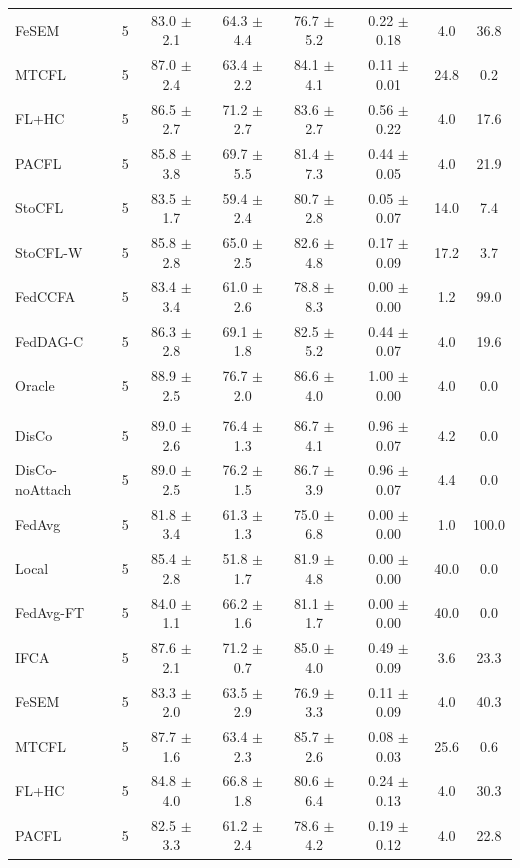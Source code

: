 {\begin{tabular}{l r c c c c c c}
FeSEM & 5 & 83.0 $\pm$ 2.1 & 64.3 $\pm$ 4.4 & 76.7 $\pm$ 5.2 & 0.22 $\pm$ 0.18 & 4.0 & 36.8 \\
MTCFL & 5 & 87.0 $\pm$ 2.4 & 63.4 $\pm$ 2.2 & 84.1 $\pm$ 4.1 & 0.11 $\pm$ 0.01 & 24.8 & 0.2 \\
FL+HC & 5 & 86.5 $\pm$ 2.7 & 71.2 $\pm$ 2.7 & 83.6 $\pm$ 2.7 & 0.56 $\pm$ 0.22 & 4.0 & 17.6 \\
PACFL & 5 & 85.8 $\pm$ 3.8 & 69.7 $\pm$ 5.5 & 81.4 $\pm$ 7.3 & 0.44 $\pm$ 0.05 & 4.0 & 21.9 \\
StoCFL & 5 & 83.5 $\pm$ 1.7 & 59.4 $\pm$ 2.4 & 80.7 $\pm$ 2.8 & 0.05 $\pm$ 0.07 & 14.0 & 7.4 \\
StoCFL-W & 5 & 85.8 $\pm$ 2.8 & 65.0 $\pm$ 2.5 & 82.6 $\pm$ 4.8 & 0.17 $\pm$ 0.09 & 17.2 & 3.7 \\
FedCCFA & 5 & 83.4 $\pm$ 3.4 & 61.0 $\pm$ 2.6 & 78.8 $\pm$ 8.3 & 0.00 $\pm$ 0.00 & 1.2 & 99.0 \\
FedDAG-C & 5 & 86.3 $\pm$ 2.8 & 69.1 $\pm$ 1.8 & 82.5 $\pm$ 5.2 & 0.44 $\pm$ 0.07 & 4.0 & 19.6 \\
Oracle & 5 & 88.9 $\pm$ 2.5 & 76.7 $\pm$ 2.0 & 86.6 $\pm$ 4.0 & 1.00 $\pm$ 0.00 & 4.0 & 0.0 \\
\addlinespace
\multicolumn{8}{l}{\textit{Mixed + QS}} \\
DisCo & 5 & 89.0 $\pm$ 2.6 & 76.4 $\pm$ 1.3 & 86.7 $\pm$ 4.1 & 0.96 $\pm$ 0.07 & 4.2 & 0.0 \\
DisCo-noAttach & 5 & 89.0 $\pm$ 2.5 & 76.2 $\pm$ 1.5 & 86.7 $\pm$ 3.9 & 0.96 $\pm$ 0.07 & 4.4 & 0.0 \\
FedAvg & 5 & 81.8 $\pm$ 3.4 & 61.3 $\pm$ 1.3 & 75.0 $\pm$ 6.8 & 0.00 $\pm$ 0.00 & 1.0 & 100.0 \\
Local & 5 & 85.4 $\pm$ 2.8 & 51.8 $\pm$ 1.7 & 81.9 $\pm$ 4.8 & 0.00 $\pm$ 0.00 & 40.0 & 0.0 \\
FedAvg-FT & 5 & 84.0 $\pm$ 1.1 & 66.2 $\pm$ 1.6 & 81.1 $\pm$ 1.7 & 0.00 $\pm$ 0.00 & 40.0 & 0.0 \\
IFCA & 5 & 87.6 $\pm$ 2.1 & 71.2 $\pm$ 0.7 & 85.0 $\pm$ 4.0 & 0.49 $\pm$ 0.09 & 3.6 & 23.3 \\
FeSEM & 5 & 83.3 $\pm$ 2.0 & 63.5 $\pm$ 2.9 & 76.9 $\pm$ 3.3 & 0.11 $\pm$ 0.09 & 4.0 & 40.3 \\
MTCFL & 5 & 87.7 $\pm$ 1.6 & 63.4 $\pm$ 2.3 & 85.7 $\pm$ 2.6 & 0.08 $\pm$ 0.03 & 25.6 & 0.6 \\
FL+HC & 5 & 84.8 $\pm$ 4.0 & 66.8 $\pm$ 1.8 & 80.6 $\pm$ 6.4 & 0.24 $\pm$ 0.13 & 4.0 & 30.3 \\
PACFL & 5 & 82.5 $\pm$ 3.3 & 61.2 $\pm$ 2.4 & 78.6 $\pm$ 4.2 & 0.19 $\pm$ 0.12 & 4.0 & 22.8 \\

\end{tabular}}
